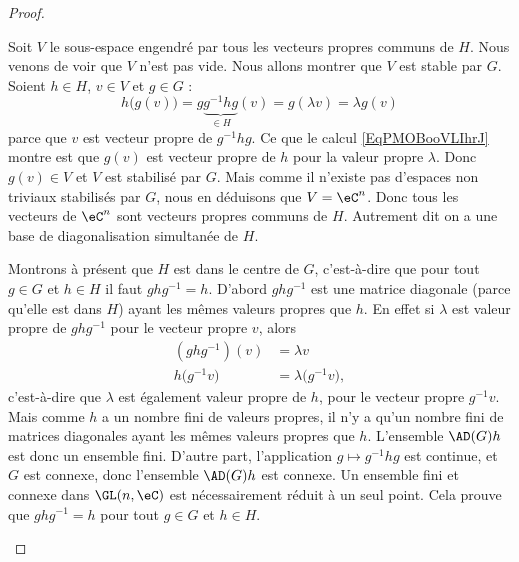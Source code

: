 \begin{proof}
\begin{subproof}
		Soit \( V\) le sous-espace engendré par tous les vecteurs propres communs de \( H\). Nous venons de voir que \( V\) n'est pas vide. Nous allons montrer que \( V\) est stable par \( G\). Soient \( h\in H\), \( v\in V\) et \( g\in G\) :
		\begin{equation}    \label{EqPMOBooVLIhrJ}
			h\big( g(v) \big)=g\underbrace{g^{-1}hg}_{\in H}(v)=g(\lambda v)=\lambda g(v)
		\end{equation}
		parce que \( v\) est vecteur propre de \( g^{-1} hg\). Ce que le calcul \eqref{EqPMOBooVLIhrJ} montre est que \( g(v)\) est vecteur propre de \( h\) pour la valeur propre \( \lambda\). Donc \( g(v)\in V\) et \( V\) est stabilisé par \( G\). Mais comme il n'existe pas d'espaces non triviaux stabilisés par \( G\), nous en déduisons que \( V=\eC^n\). Donc tous les vecteurs de \( \eC^n\) sont vecteurs propres communs de \( H\). Autrement dit on a une base de diagonalisation simultanée de \( H\).


		Montrons à présent que \( H\) est dans le centre de \( G\), c'est-à-dire que pour tout \( g\in G\) et \( h\in H\) il faut \( ghg^{-1}=h\). D'abord \( ghg^{-1}\) est une matrice diagonale (parce qu'elle est dans \( H\)) ayant les mêmes valeurs propres que \( h\). En effet si \( \lambda\) est valeur propre de \( ghg^{-1}\) pour le vecteur propre \( v\), alors
		\begin{subequations}
			\begin{align}
				(ghg^{-1})(v)         & =\lambda v                    \\
				h\big( g^{-1} v \big) & =\lambda \big( g^{-1}v \big),
			\end{align}
		\end{subequations}
		c'est-à-dire que \( \lambda\) est également valeur propre de \( h\), pour le vecteur propre \( g^{-1} v\). Mais comme \( h\) a un nombre fini de valeurs propres, il n'y a qu'un nombre fini de matrices diagonales ayant les mêmes valeurs propres que \( h\). L'ensemble \( \AD(G)h\) est donc un ensemble fini. D'autre part, l'application \( g\mapsto g^{-1}hg\) est continue, et \( G\) est connexe, donc l'ensemble \( \AD(G)h\) est connexe. Un ensemble fini et connexe dans \( \GL(n,\eC)\) est nécessairement réduit à un seul point. Cela prouve que \( ghg^{-1}=h\) pour tout \( g\in G\) et \( h\in H\).



\end{subproof}
\end{proof}
